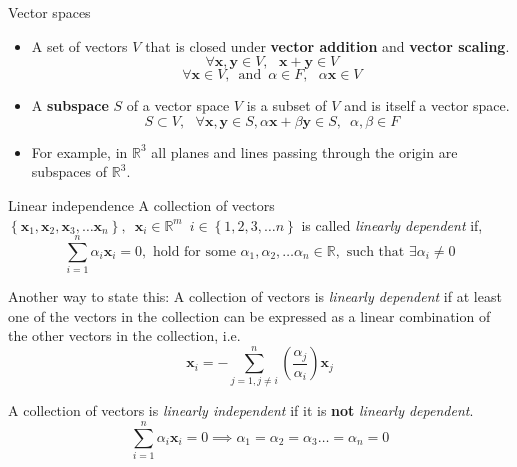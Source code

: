 \documentclass[aspectratio=169]{beamer}
\begin{document}
\begin{frame}[t]{Vector spaces}
  \begin{itemize}
    \item A set of vectors $V$ that is closed under \textbf{vector addition} and \textbf{vector scaling}.
    \[  \forall \mathbf{x}, \mathbf{y} \in V, \,\,\,\, \mathbf{x} + \mathbf{y} \in V \]
    \[  \forall \mathbf{x} \in V, \,\,\, \mathrm{and} \,\,\, \alpha \in F, \,\,\,\, \alpha \mathbf{x} \in V \]
    \item A \textbf{subspace} $S$ of a vector space $V$ is a subset of $V$ and is itself a vector space.
    \[ S \subset V, \,\,\,\, \forall \mathbf{x}, \mathbf{y} \in S, \alpha \mathbf{x} + \beta \mathbf{y} \in S, \,\,\, \alpha, \beta \in F \]
    \item For example, in $\mathbb{R}^3$ all planes and lines passing through the origin are subspaces of $\mathbb{R}^3$.
    \vspace{-0.5cm}
    
    \begin{center}
    \end{center}
  \end{itemize}
\end{frame}


\begin{frame}[t]{Linear independence}
  A collection of vectors $\left\{\mathbf{x}_1, \mathbf{x}_2, \mathbf{x}_3, \ldots \mathbf{x}_n\right\}, \,\,\, \mathbf{x}_i \in \mathbb{R}^m \,\,\, i \in\left\{1, 2, 3, \ldots n\right\}$ is called \textit{linearly dependent} if,
  \[ \sum_{i=1}^n\alpha_i\mathbf{x}_i = 0, \text{ hold for some } \alpha_1, \alpha_2, \ldots \alpha_n \in \mathbb{R}, \text{ such that } \exists \alpha_i \neq 0 \]
  
  Another way to state this: A collection of vectors is \textit{linearly dependent} if at least one of the vectors in the collection can be expressed as a linear combination of the other vectors in the collection, i.e.
  \[ \mathbf{x}_i = -\sum_{j=1, j\neq i}^{n}\left(\frac{\alpha_j}{\alpha_i}\right)\mathbf{x}_j \]
  
  A collection of vectors is \textit{linearly independent} if it is \textbf{not} \textit{linearly dependent}.
  \[ \sum_{i=1}^n\alpha_i\mathbf{x}_i = 0 \implies \alpha_1=\alpha_2=\alpha_3\ldots=\alpha_n = 0 \]
\end{frame}
\end{document}
